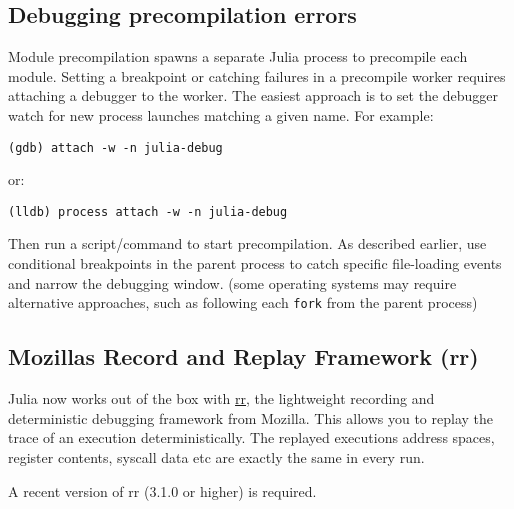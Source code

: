 \hypertarget{15283936980874101721}{}


\subsection{Debugging precompilation errors}



Module precompilation spawns a separate Julia process to precompile each module. Setting a breakpoint or catching failures in a precompile worker requires attaching a debugger to the worker. The easiest approach is to set the debugger watch for new process launches matching a given name. For example:




\begin{lstlisting}
(gdb) attach -w -n julia-debug
\end{lstlisting}



or:




\begin{lstlisting}
(lldb) process attach -w -n julia-debug
\end{lstlisting}



Then run a script/command to start precompilation. As described earlier, use conditional breakpoints in the parent process to catch specific file-loading events and narrow the debugging window. (some operating systems may require alternative approaches, such as following each \texttt{fork} from the parent process)



\hypertarget{2874239207045478266}{}


\subsection{Mozilla{\textquotesingle}s Record and Replay Framework (rr)}



Julia now works out of the box with \href{http://rr-project.org/}{rr}, the lightweight recording and deterministic debugging framework from Mozilla. This allows you to replay the trace of an execution deterministically.  The replayed execution{\textquotesingle}s address spaces, register contents, syscall data etc are exactly the same in every run.



A recent version of rr (3.1.0 or higher) is required.



